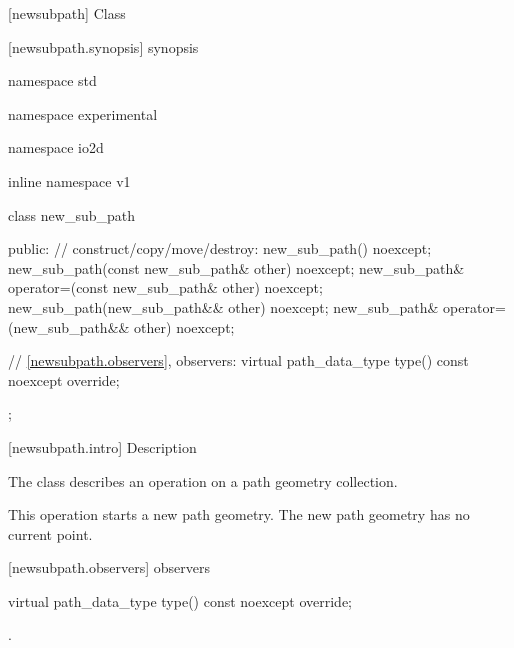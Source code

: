  [newsubpath] {Class }

 [newsubpath.synopsis] { synopsis}

\begin{codeblock}
namespace std { namespace experimental { namespace io2d { inline namespace v1 {
  class new_sub_path {
  public:
    // construct/copy/move/destroy:
    new_sub_path() noexcept;
    new_sub_path(const new_sub_path& other) noexcept;
    new_sub_path& operator=(const new_sub_path& other) noexcept;
    new_sub_path(new_sub_path&& other) noexcept;
    new_sub_path& operator=(new_sub_path&& other) noexcept;

    // \ref{newsubpath.observers}, observers:
    virtual path_data_type type() const noexcept override;
  };
} } } }
\end{codeblock}

 [newsubpath.intro] { Description}

\pnum
{}
The class  describes an operation on a path geometry collection.

\pnum
This operation starts a new path geometry. The new path geometry has no current point.

 [newsubpath.observers]{ observers}

\begin{itemdecl}
    virtual path_data_type type() const noexcept override;
\end{itemdecl}
\begin{itemdescr}
	\pnum
	\returns
	.

\end{itemdescr}
